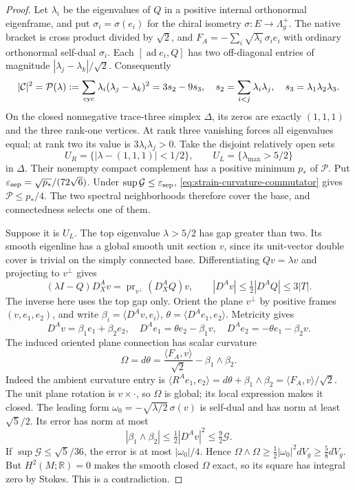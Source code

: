 \documentclass[11pt]{article}
\numberwithin{equation}{section}
\theoremstyle{definition}
\theoremstyle{remark}
\newcommand{\R}{\mathbb R}
\begin{document}
\begin{proof}
Let \(\lambda_i\) be the eigenvalues of \(Q\) in a positive
internal orthonormal eigenframe, and put \(\sigma_i=\sigma(e_i)\)
for the chiral isometry \(\sigma:E\to\Lambda_g^+\).
The native bracket is cross product
divided by \(\sqrt2\), and
\(F_A=-\sum_i\sqrt{\lambda_i}\,\sigma_i e_i\) with ordinary
orthonormal self-dual \(\sigma_i\). Each
\([\operatorname{ad}e_i,Q]\) has two off-diagonal entries of
magnitude \(|\lambda_j-\lambda_k|/\sqrt2\). Consequently
\begin{equation}\label{eq:strain-spectral-polynomial}
 |\mathcal C|^2=\mathcal P(\lambda)
   :=\sum_{\rm cyc}\lambda_i(\lambda_j-\lambda_k)^2
     =3s_2-9s_3,
 \quad s_2=\sum_{i<j}\lambda_i\lambda_j,
 \quad s_3=\lambda_1\lambda_2\lambda_3.
\end{equation}
On the closed nonnegative trace-three simplex \(\Delta\),
its zeros are exactly \((1,1,1)\) and the three rank-one vertices.
At rank three vanishing forces all eigenvalues equal; at rank two
its value is \(3\lambda_i\lambda_j>0\).
Take the disjoint relatively open sets
\[
 U_R=\{|\lambda-(1,1,1)|<1/2\},\qquad
 U_L=\{\lambda_{\max}>5/2\}
\]
in \(\Delta\). Their nonempty compact complement has a positive
minimum \(p_*\) of \(\mathcal P\). Put
\(\varepsilon_{\rm sep}=\sqrt{p_*}/(72\sqrt6)\).
Under \(\sup\mathcal G\le\varepsilon_{\rm sep}\),
\eqref{eq:strain-curvature-commutator} gives
\(\mathcal P\le p_*/4\). The two spectral neighborhoods
therefore cover the base, and connectedness selects one of them.

Suppose it is \(U_L\). The top eigenvalue \(\lambda>5/2\)
has gap greater than two. Its smooth eigenline has a global
smooth unit section \(v\), since its unit-vector double cover
is trivial on the simply connected base. Differentiating
\(Qv=\lambda v\) and projecting to \(v^\perp\) gives
\[
 (\lambda I-Q)D_X^Av=\operatorname{pr}_{v^\perp}(D_X^AQ)v,
 \qquad |D^Av|\le\tfrac12|D^AQ|\le3|T|.
\]
The inverse here uses the top gap only. Orient the plane
\(v^\perp\) by positive frames \((v,e_1,e_2)\), and write
\(\beta_i=\langle D^Av,e_i\rangle\),
\(\theta=\langle D^Ae_1,e_2\rangle\). Metricity gives
\[
 D^Av=\beta_1e_1+\beta_2e_2,\quad
 D^Ae_1=\theta e_2-\beta_1v,\quad
 D^Ae_2=-\theta e_1-\beta_2v.
\]
The induced oriented plane connection has scalar curvature
\begin{equation}\label{eq:induced-plane-curvature}
 \Omega=d\theta
   =\frac{\langle F_A,v\rangle}{\sqrt2}-\beta_1\wedge\beta_2.
\end{equation}
Indeed the ambient curvature entry is
\(\langle R^Ae_1,e_2\rangle=d\theta+\beta_1\wedge\beta_2
=\langle F_A,v\rangle/\sqrt2\). The unit plane rotation is
\(v\times\cdot\), so \(\Omega\) is global; its local
expression makes it closed. The leading form
\(\omega_0=-\sqrt{\lambda/2}\,\sigma(v)\) is self-dual and
has norm at least \(\sqrt5/2\). Its error has norm at most
\[
 |\beta_1\wedge\beta_2|\le\tfrac12|D^Av|^2
                  \le\tfrac92\mathcal G.
\]
If \(\sup\mathcal G\le\sqrt5/36\), the error is at most
\(|\omega_0|/4\). Hence
\(\Omega\wedge\Omega\ge\tfrac12|\omega_0|^2dV_g
\ge\tfrac58dV_g\).
But \(H^2(M;\R)=0\) makes the smooth closed \(\Omega\) exact,
so its square has integral zero by Stokes. This is a contradiction.


\end{proof}
\end{document}
